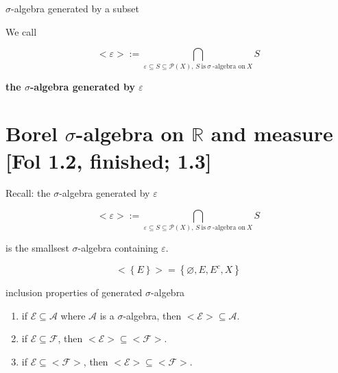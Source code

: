 \documentclass{qlnotes-export}
\begin{document}
\begin{definition}{\(\sigma\)-algebra generated by a subset}\label{def-01-sigma-algebra-measure-sigma-algebra-generated-by-a-subset}

We call

\[< \varepsilon > := \bigcap\limits_{\varepsilon \subseteq S \subseteq \mathcal{P}(X),\, S\ \text{is}\ \sigma\ \text{-algebra on}\ X}S\]

\textbf{the \(\sigma\)-algebra generated by \(\varepsilon\)}

\end{definition}

\section{\texorpdfstring{Borel \(\sigma\)-algebra on \(\mathbb{R}\) and measure {[}Fol 1.2, finished; 1.3{]}}{Borel \textbackslash sigma-algebra on \textbackslash mathbb\{R\} and measure {[}Fol 1.2, finished; 1.3{]}}}

Recall: the \(\sigma\)-algebra generated by \(\varepsilon\)

\[< \varepsilon > := \bigcap\limits_{\varepsilon \subseteq S \subseteq \mathcal{P}(X),\, S\ \text{is}\ \sigma\ \text{-algebra on}\ X}S\]

is the smallsest \(\sigma\)-algebra containing \(\varepsilon\).

\begin{example}\label{ex-01-sigma-algebra-measure-example-001}

\[< \left\{ E \right\} > = \left\{ {\varnothing,E,E^{c},X} \right\}\]

\end{example}

\begin{lemma}{inclusion properties of generated \(\sigma\)-algebra}\label{lem-01-sigma-algebra-measure-inclusion-properties-of-generated-sigma-algebra}

\begin{enumerate}
\item
  if \(\mathcal{E} \subseteq \mathcal{A}\) where \(\mathcal{A}\) is a \(\sigma\)-algebra, then \(< \mathcal{E} > \subseteq \mathcal{A}\).
\item
  if \(\mathcal{E} \subseteq \mathcal{F}\), then \(< \mathcal{E} > \subseteq < \mathcal{F} >\).
\item
  if \(\mathcal{E} \subseteq < \mathcal{F} >\), then \(< \mathcal{E} > \subseteq < \mathcal{F} >\).
\end{enumerate}

\end{lemma}
\end{document}
